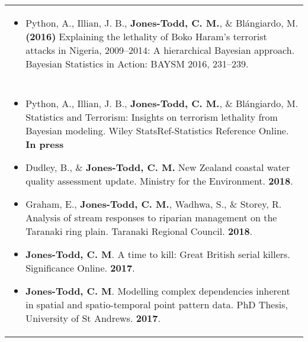 \documentclass[12pt, a4paper]{article}
\begin{document}
\begin{center}
\begin{longtable}{|p{16.3 cm}|}
\hline \cellcolor[gray]{0.8}{Refereed conference proceedings}  \\
\hline 
\begin{itemize}
\item Python, A., Illian, J. B., {\bf Jones-Todd, C. M.}, \& Bl\'angiardo, M. {\bf(2016)} Explaining the lethality of Boko Haram’s
terrorist attacks in Nigeria, 2009--2014: A hierarchical Bayesian approach. Bayesian Statistics in Action: BAYSM
2016, 231--239.
\end{itemize}\\
\hline 
\newpage
\hline \cellcolor[gray]{0.8}{Other forms of dissemination (reports for clients, technical reports, popular press, etc)}  \\
\hline
\begin{itemize}
  \item Python, A., Illian, J. B., {\bf Jones-Todd, C. M.}, \& Bl\'angiardo, M. Statistics and Terrorism: Insights on terrorism lethality from Bayesian modeling. Wiley StatsRef-Statistics Reference Online.  {\bf In press}
 \item Dudley, B., \& {\bf Jones-Todd, C. M.} New Zealand coastal water quality assessment update. Ministry for the
   Environment. {\bf 2018}.
   \item Graham, E., {\bf Jones-Todd, C. M.}, Wadhwa, S., \& Storey, R. Analysis of stream responses to riparian management
     on the Taranaki ring plain. Taranaki Regional Council. {\bf 2018}.
   \item {\bf Jones-Todd, C. M}. A time to kill: Great British serial killers. Significance Online. {\bf 2017}.
     \item {\bf Jones-Todd, C. M}. Modelling complex dependencies inherent in spatial and spatio-temporal point pattern data. PhD Thesis, University of St Andrews. {\bf 2017}.
 \end{itemize}\\

\hline
\end{longtable} \end{center}
\end{document}
